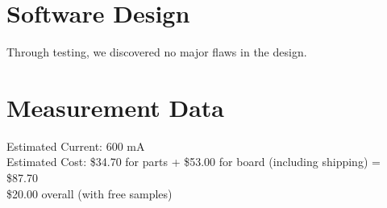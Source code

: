 \documentclass[twoside]{article}
\begin{document}
\section{Software Design}
Through testing, we discovered no major flaws in the design.

\section{Measurement Data}
Estimated Current: 600 mA \\
Estimated Cost: \$34.70 for parts + \$53.00 for board (including shipping) = \$87.70 \\
\$20.00 overall (with free samples)
 
\end{document}
